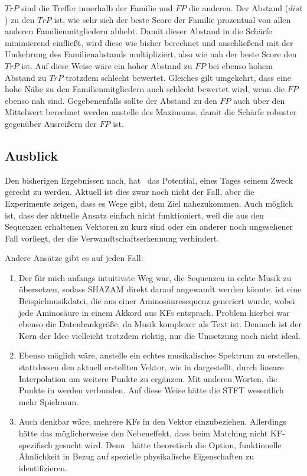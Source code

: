     $TrP$ sind die Treffer innerhalb der Familie und $FP$ die anderen. Der Abstand ($dist$) zu den $TrP$ ist, wie sehr sich der beste Score der Familie prozentual von allen anderen Familienmitgliedern abhebt. Damit dieser Abstand in die Schärfe minimierend einfließt, wird diese wie bisher berechnet und anschließend mit der Umkehrung des Familienabstands multipliziert, also wie nah der beste Score den $TrP$ ist. Auf diese Weise wäre ein hoher Abstand zu $FP$ bei ebenso hohem Abstand zu $TrP$ trotzdem schlecht bewertet. Gleiches gilt umgekehrt, dass eine hohe Nähe zu den Familienmitgliedern auch schlecht bewertet wird, wenn die $FP$ ebenso nah sind. Gegebenenfalls sollte der Abstand zu den $FP$ auch über den Mittelwert berechnet werden anstelle des Maximums, damit die Schärfe robuster gegenüber Ausreißern der $FP$ ist.

    \subsection*{Ausblick} %
        \label{sub:ausblick}
        Den bisherigen Ergebnissen nach, hat \protfin\ das Potential, eines Tages seinem Zweck gerecht zu werden. Aktuell ist dies zwar noch nicht der Fall, aber die Experimente zeigen, dass es Wege gibt, dem Ziel nahezukommen. Auch möglich ist, dass der aktuelle Ansatz einfach nicht funktioniert, weil die aus den Sequenzen erhaltenen Vektoren zu kurz sind oder ein anderer noch ungesehener Fall vorliegt, der die Verwandtschaftserkennung verhindert.

        Andere Ansätze gibt es auf jeden Fall:
        \begin{enumerate}
            \item Der für mich anfangs intuitivste Weg war, die Sequenzen in echte Musik zu übersetzen, sodass SHAZAM direkt darauf angewandt werden könnte.  ist eine Beispielmusikdatei, die aus einer Aminosäuresequenz generiert wurde, wobei jede Aminosäure in einem Akkord aus \acp{KF} entsprach. Problem hierbei war ebenso die Datenbankgröße, da Musik komplexer als Text ist. Dennoch ist der Kern der Idee vielleicht trotzdem richtig, nur die Umsetzung noch nicht ideal.
            \item Ebenso möglich wäre, anstelle ein echtes musikalisches Spektrum zu erstellen, stattdessen den aktuell erstellten Vektor, wie in  dargestellt, durch lineare Interpolation um weitere Punkte zu ergänzen. Mit anderen Worten, die Punkte in  werden verbunden. Auf diese Weise hätte die \ac{STFT} wesentlich mehr Spielraum.
            \item Auch denkbar wäre, mehrere \acp{KF} in den Vektor einzubeziehen. Allerdings hätte das möglicherweise den Nebeneffekt, dass beim Matching nicht \ac{KF}-spezifisch gesucht wird. Denn \protfin\ hätte theoretisch die Option, funktionelle Ähnlichkeit in Bezug auf spezielle physikalische Eigenschaften zu identifizieren.
        \end{enumerate}
        
